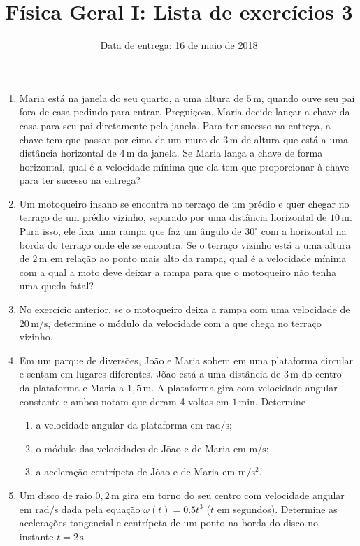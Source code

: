 \documentclass[fontsize=12pt]{scrartcl}
\title{Física Geral I: Lista de exercícios 3}
\author{Data de entrega: 16 de maio de 2018}
\date{}
\newcommand{\un}[1]{\mathrm{#1}}
\begin{document}
\maketitle
\begin{enumerate}
\item Maria está na janela do seu quarto, a uma altura de $5\,\un m$, quando ouve seu pai fora de casa pedindo para entrar. Preguiçosa, Maria decide lançar a chave da casa para seu pai diretamente pela janela. Para ter sucesso na entrega, a chave tem que passar por cima de um muro de $3\,\un m$ de altura que está a uma distância horizontal de $4\,\un m$ da janela. Se Maria lança a chave de forma horizontal, qual é a velocidade mínima que ela tem que proporcionar à chave para ter sucesso na entrega?
\item Um motoqueiro insano se encontra no terraço de um prédio e quer chegar no terraço de um prédio vizinho, separado por uma distância horizontal de $10\,\un m$. Para isso, ele fixa uma rampa que faz um ângulo de $30^\circ$ com a horizontal na borda do terraço onde ele se encontra. Se o terraço vizinho está a uma altura de $2\,\un m$ em relação ao ponto mais alto da rampa, qual é a velocidade mínima com a qual a moto deve deixar a rampa para que o motoqueiro não tenha uma queda fatal?
\item No exercício anterior, se o motoqueiro deixa a rampa com uma velocidade de $20\,\un m/\un s$, determine o módulo da velocidade com a que chega no terraço vizinho.
\item Em um parque de diversões, João e Maria sobem em uma plataforma circular e sentam em lugares diferentes. Jõao está a uma distância de $3\,\un m$ do centro da plataforma e Maria a $1,5\,\un m$. A plataforma gira com velocidade angular constante e ambos notam que deram 4 voltas em $1\,\un{min}$. Determine
  \begin{enumerate}
  \item a velocidade angular da plataforma em $\un{rad}/\un s$;
  \item o módulo das velocidades de Jõao e de Maria em $\un m/\un s$;
  \item a aceleração centrípeta de Jõao e de Maria em $\un m/\un{s}^2$.
  \end{enumerate}
\item Um disco de raio $0,2\,\un m$ gira em torno do seu centro com velocidade angular em $\un{rad}/\un s$ dada pela equação $\omega(t)=0.5t^3$ ($t$ em segundos). Determine as acelerações tangencial e centrípeta de um ponto na borda do disco no instante $t=2\,\un s$.
\end{enumerate}
\end{document}
